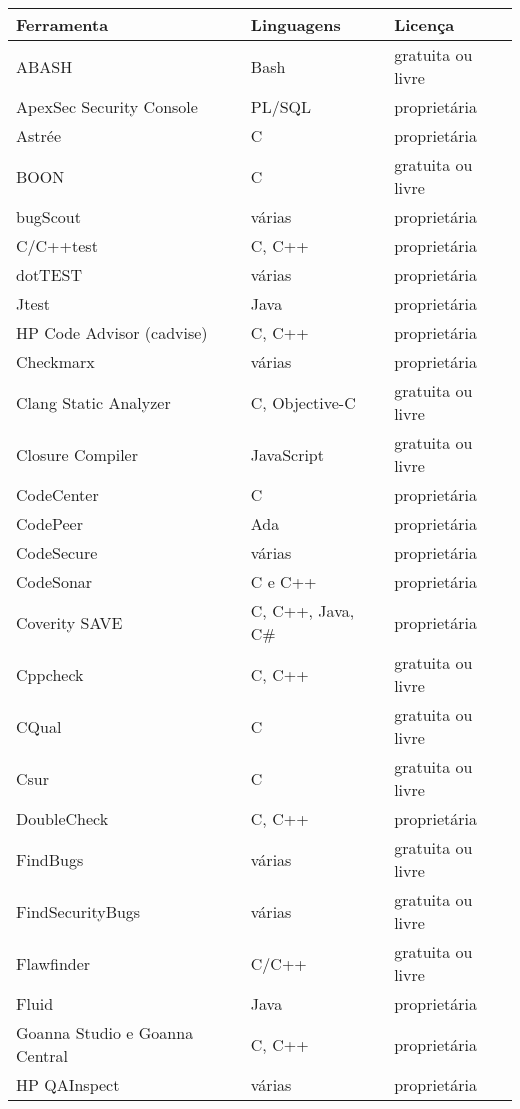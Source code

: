 \begin{center}
\begin{longtable}{ l | l | l }
\hline
Ferramenta &   Linguagens  & Licença \\ \hline
ABASH &   Bash  & gratuita ou livre \\ \hline
ApexSec Security Console &  PL/SQL   & proprietária \\ \hline
Astrée &  C   & proprietária \\ \hline
BOON &  C & gratuita ou livre \\ \hline
bugScout &  várias  & proprietária \\ \hline
C/C++test & C, C++  & proprietária \\ \hline
dotTEST &  várias & proprietária \\ \hline
Jtest & Java & proprietária \\ \hline
HP Code Advisor (cadvise) &   C, C++  & proprietária \\ \hline
Checkmarx & várias & proprietária \\ \hline
Clang Static Analyzer &  C, Objective-C  & gratuita ou livre \\ \hline
Closure Compiler &  JavaScript  & gratuita ou livre \\ \hline
CodeCenter &  C   & proprietária \\ \hline
CodePeer &  Ada   & proprietária \\ \hline
CodeSecure &  várias  & proprietária \\ \hline
CodeSonar &   C e C++   & proprietária \\ \hline
Coverity SAVE &  C, C++, Java, C\#  & proprietária \\ \hline
Cppcheck &  C, C++  & gratuita ou livre \\ \hline
CQual &   C   & gratuita ou livre \\ \hline
Csur &  C   & gratuita ou livre \\ \hline
DoubleCheck &   C, C++  & proprietária \\ \hline
FindBugs &  várias  & gratuita ou livre \\ \hline
FindSecurityBugs &  várias   & gratuita ou livre \\ \hline
Flawfinder &  C/C++   & gratuita ou livre \\ \hline
Fluid &   Java & proprietária \\ \hline
Goanna Studio e Goanna Central &  C, C++  & proprietária \\ \hline
HP QAInspect &  várias   & proprietária \\ \hline

\end{longtable}
\end{center}
